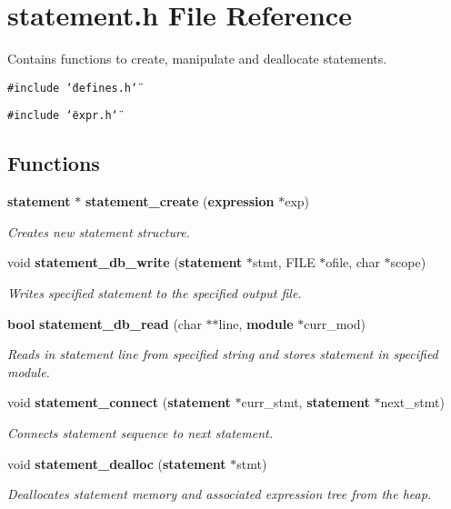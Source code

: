 \section{statement.h File Reference}
\label{statement_8h}
Contains functions to create, manipulate and deallocate statements. 


{\tt \#include \char`\"{}defines.h\char`\"{}}\par
{\tt \#include \char`\"{}expr.h\char`\"{}}\par
\subsection*{Functions}
\begin{CompactItemize}
\item 
{\bf statement} $\ast$ {\bf statement\_\-create} ({\bf expression} $\ast$exp)
\begin{CompactList}\small\item\em Creates new statement structure.\item\end{CompactList}\item 
void {\bf statement\_\-db\_\-write} ({\bf statement} $\ast$stmt, FILE $\ast$ofile, char $\ast$scope)
\begin{CompactList}\small\item\em Writes specified statement to the specified output file.\item\end{CompactList}\item 
{\bf bool} {\bf statement\_\-db\_\-read} (char $\ast$$\ast$line, {\bf module} $\ast$curr\_\-mod)
\begin{CompactList}\small\item\em Reads in statement line from specified string and stores statement in specified module.\item\end{CompactList}\item 
void {\bf statement\_\-connect} ({\bf statement} $\ast$curr\_\-stmt, {\bf statement} $\ast$next\_\-stmt)
\begin{CompactList}\small\item\em Connects statement sequence to next statement.\item\end{CompactList}\item 
void {\bf statement\_\-dealloc} ({\bf statement} $\ast$stmt)
\begin{CompactList}\small\item\em Deallocates statement memory and associated expression tree from the heap.\item\end{CompactList}\end{CompactItemize}


